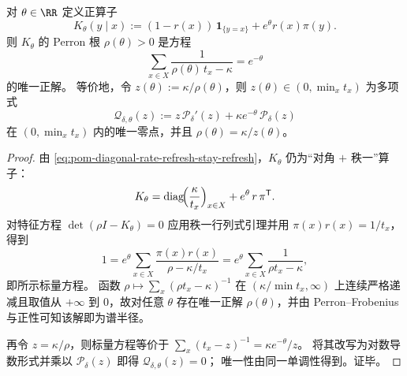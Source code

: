 \begin{theorem}\label{thm:pom-diagonal-rate-refresh-count-tilt-perron-secular}
对 \(\theta\in\RR\) 定义正算子
\[
K_\theta(y\mid x):=(1-r(x))\,\mathbf 1_{\{y=x\}}+e^{\theta}r(x)\pi(y).
\]
则 \(K_\theta\) 的 Perron 根 \(\rho(\theta)>0\) 是方程
\[
\boxed{\;
\sum_{x\in X}\frac{1}{\rho(\theta)\,t_x-\kappa}=e^{-\theta}\;}
\]
的唯一正解。
等价地，令 \(z(\theta):=\kappa/\rho(\theta)\)，则 \(z(\theta)\in(0,\min_x t_x)\) 为多项式
\[
\mathcal Q_{\delta,\theta}(z):=z\,\mathcal P_\delta'(z)+\kappa e^{-\theta}\,\mathcal P_\delta(z)
\]
在 \((0,\min_x t_x)\) 内的唯一零点，并且 \(\rho(\theta)=\kappa/z(\theta)\)。
\end{theorem}
\begin{proof}
由 \eqref{eq:pom-diagonal-rate-refresh-stay-refresh}，\(K_\theta\) 仍为“对角 \(+\) 秩一”算子：
\[
K_\theta=\mathrm{diag}\!\Bigl(\frac{\kappa}{t_x}\Bigr)_{x\in X}+e^{\theta}\,r\,\pi^{\mathsf T}.
\]
对特征方程 \(\det(\rho I-K_\theta)=0\) 应用秩一行列式引理并用 \(\pi(x)r(x)=1/t_x\)，得到
\[
1=e^{\theta}\sum_{x\in X}\frac{\pi(x)r(x)}{\rho-\kappa/t_x}
=e^{\theta}\sum_{x\in X}\frac{1}{\rho t_x-\kappa},
\]
即所示标量方程。
函数 \(\rho\mapsto \sum_x(\rho t_x-\kappa)^{-1}\) 在 \((\kappa/\min t_x,\infty)\) 上连续严格递减且取值从 \(+\infty\) 到 \(0\)，故对任意 \(\theta\) 存在唯一正解 \(\rho(\theta)\)，并由 Perron--Frobenius 与正性可知该解即为谱半径。
\par
再令 \(z=\kappa/\rho\)，则标量方程等价于
\(
\sum_x (t_x-z)^{-1}=\kappa e^{-\theta}/z
\)。
将其改写为对数导数形式并乘以 \(\mathcal P_\delta(z)\) 即得 \(\mathcal Q_{\delta,\theta}(z)=0\)；
唯一性由同一单调性得到。证毕。
\end{proof}

